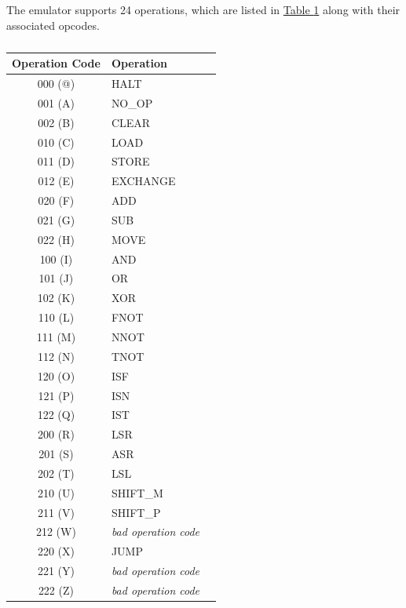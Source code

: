 \documentclass[12pt]{article}
\begin{document}
The emulator supports 24 operations, which are listed in \hyperref[tab:Opcodes]{Table \ref{tab:Opcodes}} along
with their associated opcodes.

\begin{table}[h!]
    \centering
    \caption{}
    \label{tab:Opcodes}
    \begin{tabular}{|c|l|c|} 
        \hline
        \textbf{Operation Code} & Operation \\ \hline

        000 (@) & HALT \\ \hline
        001 (A) & NO\_OP \\ \hline
        002 (B) & CLEAR \\ \hline

        010 (C) & LOAD \\ \hline
        011 (D) & STORE \\ \hline
        012 (E) & EXCHANGE \\ \hline

        020 (F) & ADD \\ \hline
        021 (G) & SUB \\ \hline
        022 (H) & MOVE \\ \hline

        100 (I) & AND \\ \hline
        101 (J) & OR \\ \hline
        102 (K) & XOR \\ \hline

        110 (L) & FNOT \\ \hline
        111 (M) & NNOT \\ \hline
        112 (N) & TNOT \\ \hline

        120 (O) & ISF \\ \hline
        121 (P) & ISN \\ \hline
        122 (Q) & IST \\ \hline

        200 (R) & LSR \\ \hline
        201 (S) & ASR \\ \hline
        202 (T) & LSL \\ \hline

        210 (U) & SHIFT\_M \\ \hline
        211 (V) & SHIFT\_P \\ \hline
        212 (W) & \textit{bad operation code} \\ \hline

        220 (X) & JUMP \\ \hline
        221 (Y) & \textit{bad operation code} \\ \hline
        222 (Z) & \textit{bad operation code} \\ \hline
    \end{tabular}
\end{table}
\end{document}
